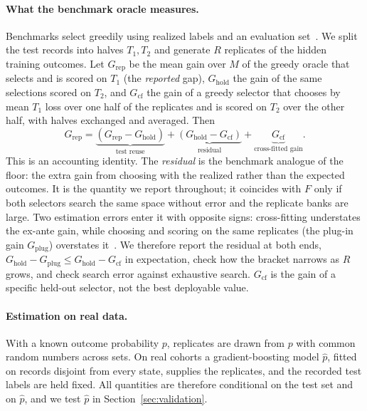 \documentclass[runningheads]{llncs}
\begin{document}
\paragraph{What the benchmark oracle measures.} Benchmarks select greedily using realized labels and an evaluation set~\cite{werner2023comparable,werner2024cdalbench}. We split the test records into halves $T_1,T_2$ and generate $R$ replicates of the hidden training outcomes. Let $G_{\mathrm{rep}}$ be the mean gain over $M$ of the greedy oracle that selects and is scored on $T_1$ (the \emph{reported} gap), $G_{\mathrm{hold}}$ the gain of the same selections scored on $T_2$, and $G_{\mathrm{cf}}$ the gain of a greedy selector that chooses by mean $T_1$ loss over one half of the replicates and is scored on $T_2$ over the other half, with halves exchanged and averaged. Then
\begin{equation}
 G_{\mathrm{rep}}=\underbrace{(G_{\mathrm{rep}}-G_{\mathrm{hold}})}_{\text{test reuse}}+\underbrace{(G_{\mathrm{hold}}-G_{\mathrm{cf}})}_{\text{residual}}+\underbrace{G_{\mathrm{cf}}}_{\text{cross-fitted gain}} .\label{eq:greedy}
\end{equation}
This is an accounting identity. The \emph{residual} is the benchmark analogue of the floor: the extra gain from choosing with the realized rather than the expected outcomes. It is the quantity we report throughout; it coincides with $F$ only if both selectors search the same space without error and the replicate banks are large. Two estimation errors enter it with opposite signs: cross-fitting understates the ex-ante gain, while choosing and scoring on the same replicates (the plug-in gain $G_{\mathrm{plug}}$) overstates it~\cite{smith2006optimizer,cawley2010overfitting}. We therefore report the residual at both ends, $G_{\mathrm{hold}}-G_{\mathrm{plug}}\le G_{\mathrm{hold}}-G_{\mathrm{cf}}$ in expectation, check how the bracket narrows as $R$ grows, and check search error against exhaustive search. $G_{\mathrm{cf}}$ is the gain of a specific held-out selector, not the best deployable value.

\paragraph{Estimation on real data.} With a known outcome probability $p$, replicates are drawn from $p$ with common random numbers across sets. On real cohorts a gradient-boosting model $\hat p$, fitted on records disjoint from every state, supplies the replicates, and the recorded test labels are held fixed. All quantities are therefore conditional on the test set and on $\hat p$, and we test $\hat p$ in Section~\ref{sec:validation}.
\end{document}
